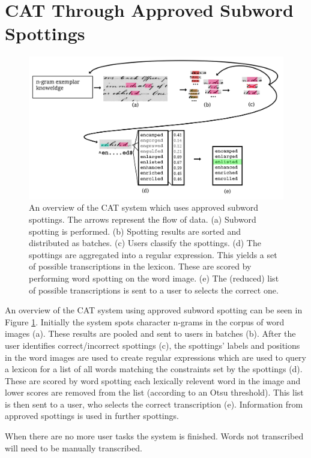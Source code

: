 \documentclass[ms,electronic,twosidetoc,letterpaper,chaptercenter,parttop,lof,lot]{byumsphd}
\begin{document}
\section{CAT Through Approved Subword Spottings}

\begin{figure}
    \centering
    \includegraphics[width=.9\textwidth]{flow6}
    \caption{An overview of the CAT system which uses approved subword spottings. The arrows represent the flow of data. (a) Subword spotting is performed. (b) Spotting results are sorted and distributed as batches. (c) Users classify the spottings. (d) The spottings are aggregated into a regular expression. This yields a set of possible transcriptions in the lexicon. These are scored by performing word spotting on the word image. (e) The (reduced) list of possible transcriptions is sent to a user to selects the correct one.}
    \label{fig:flow}
\end{figure}
An overview of the CAT system using approved subword spotting can be seen in Figure \ref{fig:flow}.  Initially the system spots character n-grams in the corpus of word images (a). These results are pooled and sent to users in batches (b). After the user identifies correct/incorrect spottings (c), the spottings' labels and positions in the word images are used to create regular expressions which are used to query a lexicon for a list of all words matching the constraints set by the spottings (d). These are scored by word spotting each lexically relevent word in the image and lower scores are removed from the list (according to an Otsu threshold). This list is then sent to a user, who selects the correct transcription (e). Information from approved spottings is used in further spottings.

When there are no more user tasks the system is finished. Words not transcribed will need to be manually transcribed.
\end{document}
